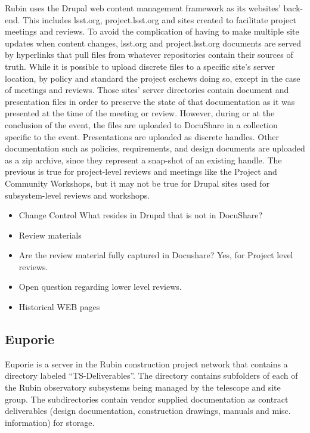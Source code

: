 Rubin uses the Drupal web content management framework as its websites’ back-end. This includes lsst.org, project.lsst.org and sites created to facilitate project meetings and reviews. To avoid the complication of having to make multiple site updates when content changes, lsst.org and project.lsst.org documents are served by hyperlinks that pull files from whatever repositories contain their sources of truth. While it is possible to upload discrete files to a specific site’s server location, by policy and standard the project eschews doing so, except in the case of meetings and reviews. Those sites’ server directories contain document and presentation files in order to preserve the state of that documentation as it was presented at the time of the meeting or review. However, during or at the conclusion of the event, the files are uploaded to DocuShare in a collection specific to the event. Presentations are uploaded as discrete handles. Other documentation such as policies, requirements, and design documents are uploaded as a zip archive, since they represent a snap-shot of an existing handle. The previous is true for project-level reviews and meetings like the Project and Community Workshops, but it may not be true for Drupal sites used for subsystem-level reviews and workshops.

\begin{itemize}
	\item Change Control What resides in Drupal that is not in DocuShare?
	\item Review materials
	\item Are the review material fully captured in Docushare?  Yes, for Project level reviews.
	\item Open question regarding lower level reviews.
	\item Historical WEB pages
\end{itemize}

\subsection{Euporie}

Euporie is a server in the Rubin construction project network that contains a directory labeled “TS-Deliverables”. The directory contains subfolders of each of the Rubin observatory subsystems being managed by the telescope and site group. The subdirectories contain vendor supplied documentation as contract deliverables (design documentation, construction drawings, manuals and misc. information) for storage.

